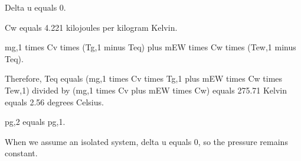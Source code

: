 Delta u equals 0.  

Cw equals 4.221 kilojoules per kilogram Kelvin.  

mg,1 times Cv times (Tg,1 minus Teq) plus mEW times Cw times (Tew,1 minus Teq).  

Therefore, Teq equals (mg,1 times Cv times Tg,1 plus mEW times Cw times Tew,1) divided by (mg,1 times Cv plus mEW times Cw) equals 275.71 Kelvin equals 2.56 degrees Celsius.  

pg,2 equals pg,1.  

When we assume an isolated system, delta u equals 0, so the pressure remains constant.